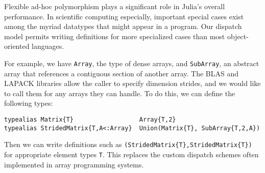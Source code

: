 Flexible ad-hoc polymorphism plays a significant role in Julia's overall
performance. In scientific computing especially, important special cases
exist among the myriad datatypes that might appear in a program. Our
dispatch model permits writing definitions for more specialized cases
than most object-oriented languages.

For example, we have {\tt Array}, the type of dense arrays, and
{\tt SubArray}, an abstract array that references a contiguous section of
another array. The BLAS and LAPACK libraries allow the caller to specify
dimension strides, and we would like to call them for any arrays they
can handle. To do this, we can define the following types:

\vspace{-0.2in}
\begin{singlespace}
\begin{verbatim}
typealias Matrix{T}                  Array{T,2}
typealias StridedMatrix{T,A<:Array}  Union(Matrix{T}, SubArray{T,2,A})
\end{verbatim}
\end{singlespace}

Then we can write definitions such as
{\tt *(StridedMatrix\{T\},StridedMatrix\{T\})} for appropriate element types
{\tt T}. This replaces the custom dispatch schemes often implemented in
array programming systems.

